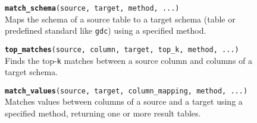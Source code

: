 \begin{figure}[t]
\centering
\begin{tcolorbox}[colback=black!2.5!white,colframe=black!85!black,boxrule=0.25mm,boxsep=4pt,left=0pt,right=0pt,top=0pt,bottom=0pt]

    \footnotesize
    
    \texttt{\textbf{match\_schema}(source, target, method, ...)} \\
    Maps the schema of a source table to a target schema (table or predefined standard like \texttt{gdc}) using a specified method.
    \vspace{.5em}
    
    
    \texttt{\textbf{top\_matches}(source, column, target, top\_k, method, ...)} \\
    Finds the top-\texttt{k} matches between a source column and columns of a target schema.
    \vspace{.5em}
    
    
    \texttt{\textbf{match\_values}(source, target, column\_mapping, method, ...)} \\
    Matches values between columns of a source and a target using a specified method, returning one or more result tables.
    \vspace{.5em}
    
    
    
    

    

    


\end{tcolorbox}
\end{figure}
